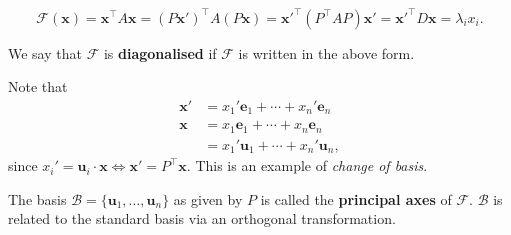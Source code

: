 \documentclass[a4paper]{article}
\begin{document}
    \[
      \mathcal{F}(\mathbf{x})=
      \mathbf{x}^{\top}A\mathbf{x}=(P\mathbf{x}')^{\top}A(P\mathbf{x})=\mathbf{x}'^{\top}(P^{\top}AP)\mathbf{x}'=\mathbf{x}'^{\top}D\mathbf{x}
      = \lambda_i x_i.
    \]
    \begin{definition}
      We say that $\mathcal{F}$ is \textbf{diagonalised} if
      $\mathcal{F}$ is written in the above form.
    \end{definition}
    Note that
    \begin{align*}
      \mathbf{x}'&= x_1'\mathbf{e}_1+\cdots+x_n'\mathbf{e}_n\\
      \mathbf{x}&= x_1\mathbf{e}_1+ \cdots + x_n\mathbf{e}_n\\
      &= x_1'\mathbf{u}_1+\cdots +x_n'\mathbf{u}_n,
    \end{align*}
    since $x_i' = \mathbf{u}_i\cdot \mathbf{x} \Leftrightarrow
    \mathbf{x}'=P^{\top}\mathbf{x}$. This is an example of
    \textit{change of basis}.
    \begin{definition}
      The basis $ \mathcal{B} = \{\mathbf{u}_1,\dots,\mathbf{u}_n\} $
      as given by $P$ is called the \textbf{principal axes} of
      $\mathcal{F}$. $\mathcal{B}$ is related to the standard basis
      via an orthogonal transformation.
    \end{definition}
\end{document}

